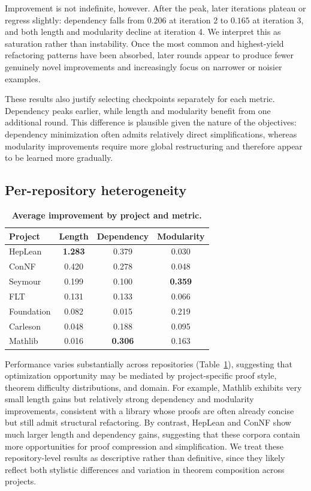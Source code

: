 Improvement is not indefinite, however.
After the peak, later iterations plateau or regress slightly: dependency falls from $0.206$ at iteration 2 to $0.165$ at iteration 3, and both length and modularity decline at iteration 4.
We interpret this as saturation rather than instability.
Once the most common and highest-yield refactoring patterns have been absorbed, later rounds appear to produce fewer genuinely novel improvements and increasingly focus on narrower or noisier examples.

These results also justify selecting checkpoints separately for each metric.
Dependency peaks earlier, while length and modularity benefit from one additional round.
This difference is plausible given the nature of the objectives: dependency minimization often admits relatively direct simplifications, whereas modularity improvements require more global restructuring and therefore appear to be learned more gradually.




\subsection{Per-repository heterogeneity}
\label{sec:repo_hetero}



\begin{table}
\centering
\caption[Average improvement by project and metric.]{\textbf{Average improvement by project and metric.}}
\label{tab:project_improvement}
\small
\begin{tabular}{l|ccc}
\hline
\textbf{Project} & \textbf{Length} & \textbf{Dependency} & \textbf{Modularity} \\
\hline
HepLean    & \textbf{1.283} & 0.379 & 0.030 \\
ConNF      & 0.420 & 0.278 & 0.048 \\
Seymour    & 0.199 & 0.100 & \textbf{0.359} \\
FLT        & 0.131 & 0.133 & 0.066 \\
Foundation & 0.082 & 0.015 & 0.219 \\
Carleson    & 0.048 & 0.188 & 0.095 \\
Mathlib    & 0.016 & \textbf{0.306} & 0.163 \\
\hline
\end{tabular}
\end{table}

Performance varies substantially across repositories (Table~\ref{tab:project_improvement}), suggesting that optimization opportunity may be mediated by project-specific proof style, theorem difficulty distributions, and domain.
For example, Mathlib exhibits very small length gains but relatively strong dependency and modularity improvements, consistent with a library whose proofs are often already concise but still admit structural refactoring.
By contrast, HepLean and ConNF show much larger length and dependency gains, suggesting that these corpora contain more opportunities for proof compression and simplification.
We treat these repository-level results as descriptive rather than definitive, since they likely reflect both stylistic differences and variation in theorem composition across projects.



